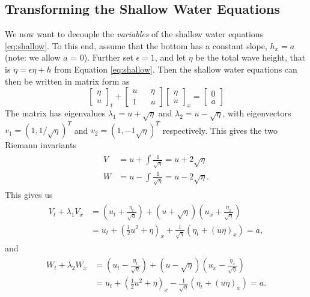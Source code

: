 \documentclass[11pt]{article}
\begin{document}
\subsection{Transforming the Shallow Water Equations}
We now want to decouple the \emph{variables} of the shallow water equations \ref{eq:shallow}. To this end, 
assume that the bottom has a constant slope, $h_x = a$ (note: we allow $a$ = 0). Further set $\epsilon =1$,
and let $\eta$ be the total wave height, that is $\eta = \epsilon\eta + h$ from Equation \eqref{eq:shallow}.
Then the shallow water equations can then be written in matrix form as
\begin{equation}
\begin{bmatrix}
	\eta \\
	u
\end{bmatrix}_t
+
\begin{bmatrix}
u	&& 	\eta \\
1 	&&	u
\end{bmatrix}
\begin{bmatrix}
\eta\\
u
\end{bmatrix}_x
= 
\begin{bmatrix}
0\\
a
\end{bmatrix}
\end{equation}
The matrix has eigenvalues $\lambda_1 = u + \sqrt{\eta}$ and $\lambda_2 = u - \sqrt{\eta}$, with eigenvectors $v_1 = (1,1/\sqrt{\eta})^T$ and $v_2 = (1, {-}1\sqrt{\eta})^T$ respectively. This gives the two Riemann invariants
\begin{align}
	\begin{aligned}
		V &= u + \int \frac{1}{\sqrt{\eta}} = u + 2\sqrt{\eta}\\
		W &= u - \int \frac{1}{\sqrt{\eta}} = u - 2\sqrt{\eta}.
	\end{aligned}
\end{align}
This gives us
\begin{align}
\begin{aligned}
	\label{eq:shallowWaterRiemannV}
	V_t + \lambda_1V_x &= \left(u_t + \frac{\eta_t}{\sqrt{\eta}}\right) + (u + \sqrt{\eta})\left(u_x + \frac{\eta_x}{\sqrt \eta}\right)\\
	& = u_t + \left(\frac{1}{2}u^2 + \eta\right)_x + \frac{1}{\sqrt \eta}(\eta_t + (u\eta)_x) = a,
\end{aligned}
\end{align}
and
\begin{align}
	\label{eq:shallowWaterRiemannW}
	\begin{aligned}
		W_t + \lambda_2W_x &= \left(u_t - \frac{\eta_t}{\sqrt{\eta}}\right) + (u - \sqrt{\eta})\left(u_x - \frac{\eta_x}{\sqrt \eta}\right)\\
		& = u_t + \left(\frac{1}{2}u^2 + \eta\right)_x - \frac{1}{\sqrt \eta}(\eta_t + (u\eta)_x) = a.
	\end{aligned}
\end{align}
\end{document}
